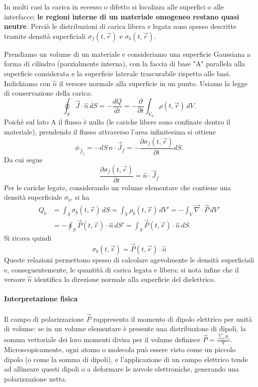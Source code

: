 \documentclass{book}
\begin{document}
In molti casi la carica in eccesso o difetto si localizza alle superfici o alle interfacce; \textbf{le regioni interne di un materiale omogeneo restano quasi neutre}. Perci\`o le distribuzioni di carica libera e legata sono spesso descritte tramite densit\`a superficiali $\sigma_f(t,\vec{r})$ e $\sigma_b(t,\vec{r})$.

Prendiamo un volume di un materiale e consideriamo una superficie Gaussiana a forma di cilindro (parzialmente interna), con la faccia di base "A" parallela alla superficie considerata e la superficie laterale trascurabile rispetto alle basi. Indichiamo con $\hat{n}$ il versore normale alla superficie in un punto.
Usiamo la legge di conservazione della carica:
\[
\oint_S \vec{J}\cdot\hat{n}\,dS = -\frac{dQ}{dt} = -\frac{\partial}{\partial t}\int_{V_S} \rho(t,\vec{r})\,dV.
\]
Poich\`e sul lato A il flusso \`e nullo (le cariche libere sono confinate dentro il materiale), prendendo il flusso attraverso l'area infinitesima si ottiene
\[
\phi_{\vec{J}_f} = -dS\,\hat{n}\cdot\vec{J}_f = -\frac{\partial\sigma_f(t,\vec{r})}{\partial t}dS.
\]
Da cui segue
\[
\boxed{\displaystyle \frac{\partial\sigma_f(t,\vec{r})}{\partial t} = \hat{n}\cdot\vec{J}_f }
\]
Per le cariche legate, considerando un volume elementare che contiene una densit\`a superficiale $\sigma_b$, si ha
\begin{align*}
Q_b &= \int_S \sigma_b(t,\vec{r})\,dS = \int_{V} \rho_b(t,\vec{r})\,dV' = -\int_{V} \vec{\nabla}\cdot\vec{P}\,dV' \\
&= -\oint_{S} \vec{P}(t,\vec{r})\cdot\hat{n}\,dS' = \int_S \vec{P}(t,\vec{r})\cdot\hat{n}\,dS.
\end{align*}
Si ricava quindi
\[
\boxed{\displaystyle \sigma_b(t,\vec{r}) = \vec{P}(t,\vec{r})\cdot\hat{n} }
\]
Queste relazioni permettono spesso di calcolare agevolmente le densit\`a superficiali e, conseguentemente, le quantit\`a di carica legata e libera; si nota infine che il versore $\hat{n}$ identifica la direzione normale alla superficie del dielettrico.

\paragraph{Interpretazione fisica}

Il campo di polarizzazione $\vec{P}$ rappresenta il momento di dipolo elettrico per unit\`a di volume: se in un volume elementare \`e presente una distribuzione di dipoli, la somma vettoriale dei loro momenti divisa per il volume definisce $\vec{P} = \frac{\sum_i p_i}{V}$. Microscopicamente, ogni atomo o molecola pu\`o essere visto come un piccolo dipolo (o come la somma di dipoli), e l'applicazione di un campo elettrico tende ad allineare questi dipoli o a deformare le nuvole elettroniche, generando una polarizzazione netta.
\end{document}
